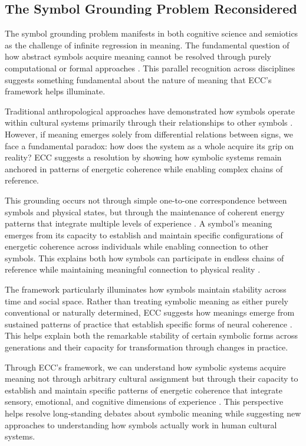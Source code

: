 \subsection{The Symbol Grounding Problem Reconsidered}

The symbol grounding problem manifests in both cognitive science and semiotics as the challenge of infinite regression in meaning. The fundamental question of how abstract symbols acquire meaning cannot be resolved through purely computational or formal approaches \cite{harnad1990symbol}. This parallel recognition across disciplines suggests something fundamental about the nature of meaning that ECC's framework helps illuminate.

Traditional anthropological approaches have demonstrated how symbols operate within cultural systems primarily through their relationships to other symbols \cite{saussure1983course}. However, if meaning emerges solely from differential relations between signs, we face a fundamental paradox: how does the system as a whole acquire its grip on reality? ECC suggests a resolution by showing how symbolic systems remain anchored in patterns of energetic coherence while enabling complex chains of reference.

This grounding occurs not through simple one-to-one correspondence between symbols and physical states, but through the maintenance of coherent energy patterns that integrate multiple levels of experience \cite{lakoff1999philosophy}. A symbol's meaning emerges from its capacity to establish and maintain specific configurations of energetic coherence across individuals while enabling connection to other symbols. This explains both how symbols can participate in endless chains of reference while maintaining meaningful connection to physical reality \cite{peirce1931collected}.

The framework particularly illuminates how symbols maintain stability across time and social space. Rather than treating symbolic meaning as either purely conventional or naturally determined, ECC suggests how meanings emerge from sustained patterns of practice that establish specific forms of neural coherence \cite{barsalou1999perceptual}. This helps explain both the remarkable stability of certain symbolic forms across generations and their capacity for transformation through changes in practice.

Through ECC's framework, we can understand how symbolic systems acquire meaning not through arbitrary cultural assignment but through their capacity to establish and maintain specific patterns of energetic coherence that integrate sensory, emotional, and cognitive dimensions of experience \cite{varela1991embodied}. This perspective helps resolve long-standing debates about symbolic meaning while suggesting new approaches to understanding how symbols actually work in human cultural systems.


